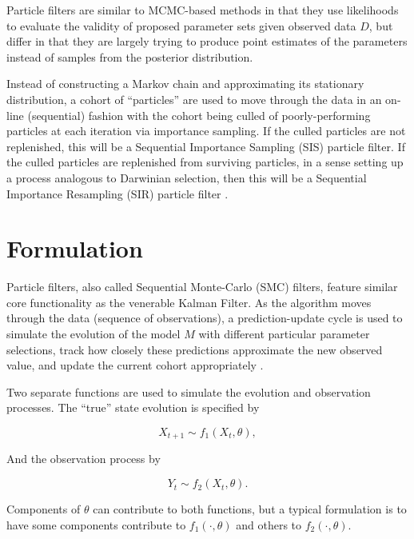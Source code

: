 


	Particle filters are similar to MCMC-based methods in that they use likelihoods to evaluate the validity of proposed parameter sets given observed data $D$, but differ in that they are largely trying to produce point estimates of the parameters instead of samples from the posterior distribution.

	Instead of constructing a Markov chain and approximating its stationary distribution, a cohort of ``particles'' are used to move through the data in an on-line (sequential) fashion with the cohort being culled of poorly-performing particles at each iteration via importance sampling. If the culled particles are not replenished, this will be a Sequential Importance Sampling (SIS) particle filter. If the culled particles are replenished from surviving particles, in a sense setting up a process analogous to Darwinian selection, then this will be a Sequential Importance Resampling (SIR) particle filter \cite{Arulampalam2002}.


\section{Formulation}

	Particle filters, also called Sequential Monte-Carlo (SMC) filters, feature similar core functionality as the venerable Kalman Filter. As the algorithm moves through the data (sequence of observations), a prediction-update cycle is used to simulate the evolution of the model $M$ with different particular parameter selections, track how closely these predictions approximate the new observed value, and update the current cohort appropriately \cite{Arulampalam2002}.

	Two separate functions are used to simulate the evolution and observation processes. The ``true'' state evolution is specified by

	\begin{equation}
		X_{t+1} \sim f_1 (X_t, \theta),
	\end{equation}

	And the observation process by

	\begin{equation}
		Y_t \sim f_2 (X_t, \theta).
	\end{equation}

	Components of $\theta$ can contribute to both functions, but a typical formulation is to have some components contribute to $f_1 (\cdot, \theta)$ and others to $f_2 (\cdot,\theta)$.

